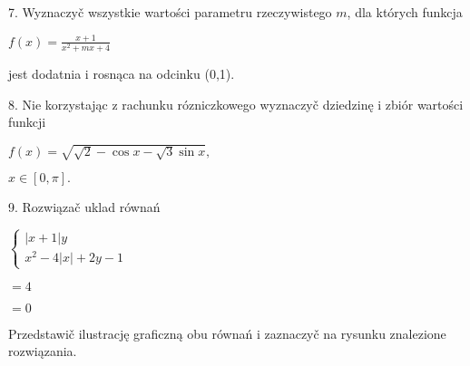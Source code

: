 \documentclass[a4paper,12pt]{article}
\begin{document}
7. Wyznaczyč wszystkie wartości parametru rzeczywistego $m$, dla których funkcja

$f(x)=\displaystyle \frac{x+1}{x^{2}+mx+4}$

jest dodatnia i rosnąca na odcinku (0,1).

8. Nie korzystając z rachunku rózniczkowego wyznaczyč dziedzinę i zbiór wartości funkcji

$f(x)=\sqrt{\sqrt{2}-\cos x-\sqrt{3}\sin x},$

$x\in[0,\pi].$

9. Rozwiązač uklad równań

$\left\{\begin{array}{l}
|x+1|y\\
x^{2}-4|x|+2y-1
\end{array}\right.$

$=4$

$=0$

Przedstawič ilustrację graficzną obu równań i zaznaczyč na rysunku znalezione rozwiązania.
\end{document}
